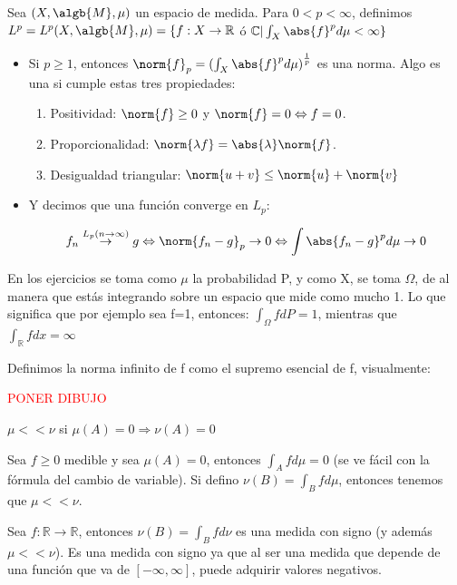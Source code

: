 \documentclass{apuntes}
\begin{document}
\begin{defn}
Sea $(X, \algb{M}, \mu)$ un espacio de medida. Para $0<p<\infty$, definimos $L^p=L^p(X,\algb{M},\mu)=\{f:X\rightarrow \mathbb{R}$ ó $\mathbb{C} | \int_X \abs{f}^p d\mu < \infty\}$

\begin{itemize}
\item Si $p \geq 1$, entonces $\norm{f}_p = (\int_X {\abs{f}^p d\mu)}^{\frac{1}{p}}$ es una norma. Algo es una si cumple estas tres propiedades:
\begin{enumerate}
\item Positividad: $\norm{f}\geq 0$ y $\norm{f} = 0 \Leftrightarrow f=0$.
\item Proporcionalidad: $\norm{\lambda f} = \abs{\lambda}\norm{f}$.
\item Desigualdad triangular: $\norm{u+v} \leq \norm{u}+\norm{v}$
\end{enumerate}
\item Y decimos que una función converge en $L_p$:

\[
f_n \stackrel{L_p (n\rightarrow \infty)}{\rightarrow} g \Leftrightarrow \norm{f_n -g}_p  \rightarrow 0 \Leftrightarrow \int{\abs{f_n -g}^pd\mu} \rightarrow 0
\]
\end{itemize}

\obs En los ejercicios se toma como $\mu$ la probabilidad P, y como X, se toma $\Omega$, de al manera que estás integrando sobre un espacio que mide como mucho 1. Lo que significa que por ejemplo sea f=1, entonces: $\int_{\Omega}fdP = 1$, mientras que $\int_{\mathbb{R}}fdx = \infty$

\obs Definimos la norma infinito de f como el supremo esencial de f, visualmente:

\textcolor{red}{PONER DIBUJO}

\end{defn}

\begin{defn}
$\mu << \nu$ si $\mu(A)=0 \Rightarrow \nu(A)=0$

\begin{example}
Sea $f \geq 0$ medible y sea $\mu(A)=0$, entonces $\int_Afd\mu=0$ (se ve fácil con la fórmula del cambio de variable). Si defino $\nu(B)=\int_B fd\mu$, entonces tenemos que $\mu << \nu$.
\end{example}
\end{defn}

\begin{defn}
Sea $f:\mathbb{R}\rightarrow \mathbb{R}$, entonces $\nu(B)=\int_B fd\nu$ es una medida con signo (y además $\mu << \nu$). Es una medida con signo ya que al ser una medida que depende de una función que va de $[-\infty, \infty]$, puede adquirir valores negativos.
\end{defn}
\end{document}
